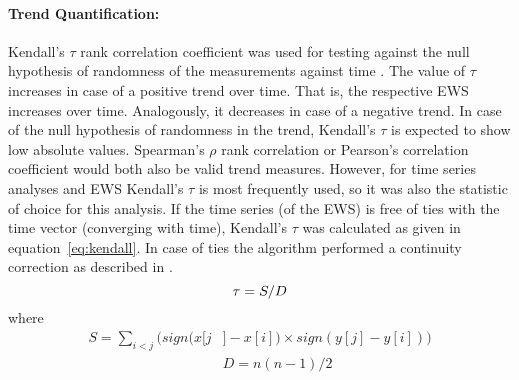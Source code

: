 \paragraph{Trend Quantification:}
Kendall's $\tau$ rank correlation coefficient \citep[after][]{kendall1938} was used for testing against the null hypothesis of randomness of the measurements against time \citep{dakos2012}. The value of $\tau$ increases in case of a positive trend over time. That is, the respective EWS increases over time. Analogously, it decreases in case of a negative trend. In case of the null hypothesis of randomness in the trend, Kendall's $\tau$ is expected to show low absolute values. Spearman's $\rho$ rank correlation or Pearson's correlation coefficient would both also be valid trend measures. However, for time series analyses and EWS Kendall's $\tau$ is most frequently used, so it was also the statistic of choice for this analysis. If the time series (of the EWS) is free of ties with the time vector (converging with time), Kendall's $\tau$ was calculated as given in equation~\ref{eq:kendall}. In case of ties the algorithm \citep{mcleod2005} performed a continuity correction as described in \cite{kendall1976}. 
\begin{equation}\label{eq:kendall}
	\tau = S / D \\
\end{equation}	
where 
\begin{equation*}
\begin{aligned}
	S = \sum_{i < j} (sign(x[j & ] - x[i]) \times sign(y[j] - y[i])) \\
	&D = n(n - 1)/2
\end{aligned}
\end{equation*}\\

